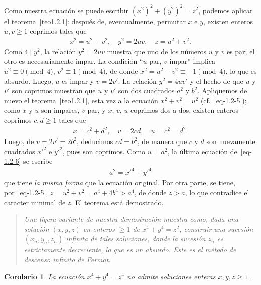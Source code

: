 \documentclass[bibtotoc,leqno,spanish]{amsbook}
\numberwithin{equation}{section}
\newenvironment{comm}%
	{\begin{quotation}\itshape\Small}
	{\end{quotation}}
\theoremstyle{note}
\theoremstyle{note}
\newtheorem*{corollary*}{Corolario}
\theoremstyle{rem}
\numberwithin{theorem}{section}
\numberwithin{proposition}{section}
\numberwithin{definition}{section}
\numberwithin{lemma}{section}
\numberwithin{corollary}{section}
\numberwithin{example}{section}
\numberwithin{footnote}{section}%
\begin{document}
Como nuestra
ecuaci\'on se puede escribir $(x^{2})^{2}+(y^{2})^{2}=z^{2}$, podemos aplicar el teorema~\ref{teo1.2.1}: despu\'es
de, eventualmente, permutar $x$ e $y$, existen enteros $u, v\geq 1$ coprimos tales que
\begin{gather}\label{eq-1.2-5}
x^{2} = u^{2}-v^{2},\quad y^{2} = 2uv,\quad z = u^{2}+v^{2}.
\end{gather}
Como $4\mid y^{2}$, la relaci\'on $y^{2} = 2uv$ muestra que uno de los n\'umeros $u$ y $v$ es
par; el otro es necesariamente impar. La condici\'on ``$u$ par, $v$ impar'' implica
$u^{2}\equiv 0\pmod 4$, $v^{2}\equiv 1\pmod 4$, de donde $x^{2}=u^{2}-v^{2}\equiv -1\pmod 4$,
lo que es absurdo. Luego, $u$ es impar y $v = 2v'$. La relaci\'on $y^{2} = 4uv'$ y el hecho
de que $u$ y $v'$ son coprimos muestran que $u$ y $v'$ son dos cuadrados $a^{2}$ y $b^{2}$.
Apliquemos de nuevo el teorema~\ref{teo1.2.1}, esta vez a la ecuaci\'on $x^{2}+v^{2} = u^{2}$ (cf.~\eqref{eq-1.2-5});
como $x$ y $u$ son impares, $v$ par, y $x$, $v$, $u$ coprimos dos a dos, existen enteros coprimos
$c,d\geq 1$ tales que
\begin{gather}\label{eq-1.2-6}
x = c^{2}+d^{2},\quad v = 2cd,\quad u=c^{2}=d^{2}.
\end{gather}
Luego, de $v = 2v' = 2b^{2}$, deducimos $cd = b^{2}$, de manera que $c$ y $d$ son nuevamente
cuadrados $x'^{2}$ e $y'^{2}$, pues son coprimos. Como $u=a^{2}$, la \'ultima ecuaci\'on de~\eqref{eq-1.2-6}
se escribe
\begin{gather}
a^{2} = x'^{4}+y'^{4}
\end{gather}
que tiene {\em la misma forma} que la ecuaci\'on original. Por otra parte, se tiene, por~\eqref{eq-1.2-5},
$z = u^{2}+v^{2} = a^{4}+4b^{4} > a^{4}$, de donde $z > a$, lo que contradice el caracter minimal
de $z$. El teorema est\'a demostrado.

\begin{comm}
Una ligera variante de nuestra demostraci\'on muestra como, dada una soluci\'on $(x,y,z)$
en enteros $\geq 1$ de $x^{4}+y^{4}=z^{2}$, construir una sucesi\'on $(x_{n},y_{n},z_{n})$
infinita de tales soluciones, donde la sucesi\'on $z_{n}$ es estrictamente decreciente, lo
que es un absurdo. Este es el m\'etodo de {\em descenso infinito} de Fermat.
\end{comm}

\begin{corollary*}
La ecuaci\'on $x^{4}+y^{4}=z^{4}$ no admite soluciones enteras $x,y,z\geq 1$.
\end{corollary*}
\end{document}
